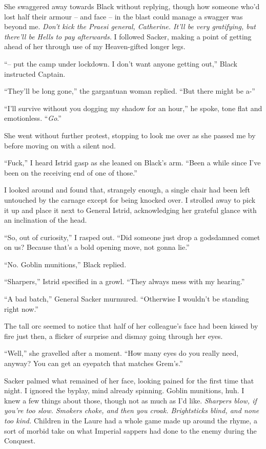 \documentclass[12pt, openany]{book}
\begin{document}
She swaggered away towards Black without replying, though how someone who’d lost half their armour – and face – in the blast could manage a swagger was beyond me. \textit{Don’t kick the Praesi general, Catherine. It’ll be very gratifying, but there’ll be Hells to pay afterwards.} I followed Sacker, making a point of getting ahead of her through use of my Heaven-gifted longer legs.

“– put the camp under lockdown. I don’t want anyone getting out,” Black instructed Captain.

“They’ll be long gone,” the gargantuan woman replied. “But there might be a-”

“I’ll survive without you dogging my shadow for an hour,” he spoke, tone flat and emotionless. “\textit{Go}.”

She went without further protest, stopping to look me over as she passed me by before moving on with a silent nod.

“Fuck,” I heard Istrid gasp as she leaned on Black’s arm. “Been a while since I’ve been on the receiving end of one of those.”

I looked around and found that, strangely enough, a single chair had been left untouched by the carnage except for being knocked over. I strolled away to pick it up and place it next to General Istrid, acknowledging her grateful glance with an inclination of the head.

“So, out of curiosity,” I rasped out. “Did someone just drop a godsdamned comet on us? Because that’s a bold opening move, not gonna lie.”

“No. Goblin munitions,” Black replied.

“Sharpers,” Istrid specified in a growl. “They always mess with my hearing.”

“A bad batch,” General Sacker murmured. “Otherwise I wouldn’t be standing right now.”

The tall orc seemed to notice that half of her colleague’s face had been kissed by fire just then, a flicker of surprise and dismay going through her eyes.

“Well,” she gravelled after a moment. “How many eyes do you really need, anyway? You can get an eyepatch that matches Grem’s.”

Sacker palmed what remained of her face, looking pained for the first time that night. I ignored the byplay, mind already spinning. Goblin munitions, huh. I knew a few things about those, though not as much as I’d like. \textit{Sharpers blow, if you’re too slow. Smokers choke, and then you croak. Brightsticks blind, and none too kind.} Children in the Laure had a whole game made up around the rhyme, a sort of morbid take on what Imperial sappers had done to the enemy during the Conquest.
\end{document}
